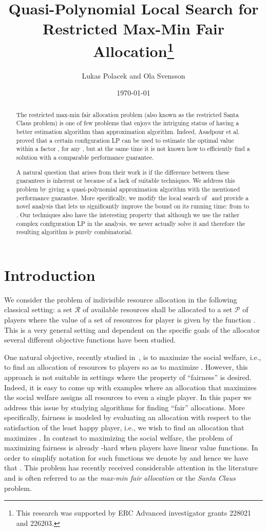 \documentclass{llncs}
\title{Quasi-Polynomial Local Search for Restricted Max-Min Fair Allocation\thanks{This research was supported by ERC Advanced investigator grants 228021 and 226203.}}
\author{Lukas Polacek\inst{1} and Ola Svensson\inst{2}}
\institute{KTH Royal Institute of Technology, Sweden
  \email{polacek@csc.kth.se}
  \and EPFL, Switzerland
  \email{ola.svensson@epfl.ch}
}
\date{\today}
\newcommand{\res}{\ensuremath{\mathcal{R}}\xspace}
\newcommand{\players}{\ensuremath{\mathcal{P}}\xspace}
\begin{document}
\maketitle

\begin{abstract}
The restricted max-min fair allocation problem (also known as the
restricted Santa Claus problem) is one of few problems that enjoys the
intriguing status of having a better estimation algorithm than
approximation algorithm. Indeed, Asadpour et al.~\cite{AFS08} proved
that a certain configuration LP can be used to estimate the optimal
value within a factor , for any , but at
the same time it is not known how to efficiently find a solution with
a comparable performance guarantee.

A natural question that arises from their work is if the difference
between these guarantees is inherent or because of a lack of suitable
techniques. We address this problem by giving a quasi-polynomial
approximation algorithm with the mentioned performance guarantee. More
specifically, we modify the local search of~\cite{AFS08} and provide a
novel analysis that lets us significantly improve the bound on its
running time: from  to . Our techniques also
have the interesting property that although we use the rather complex
configuration LP in the analysis, we never actually solve it and
therefore the resulting algorithm is purely combinatorial.
\end{abstract}

\section{Introduction}


We consider the problem of indivisible resource allocation in the
following classical setting: a set \res of available resources shall
be allocated to a set \players of players where the value of a set of
resources for player  is given by the function .
This is a very general setting and dependent on the specific goals of
the allocator several different objective functions have been studied.

One natural objective, recently studied
in~\cite{DS06,Feige06,FV06,Vondrak08}, is to maximize the social
welfare, i.e., to find an allocation  of
resources to players so as to maximize .  However, this approach is not suitable in settings
where the property of ``fairness'' is desired.  Indeed, it is easy to
come up with examples where an allocation that maximizes the social
welfare assigns all resources to even a single player. In this
paper we address this issue by studying algorithms for finding
``fair'' allocations. More specifically, fairness is modeled by
evaluating an allocation with respect to the satisfaction of the least
happy player, i.e., we wish to find an allocation  that maximizes
. In contrast to maximizing the
social welfare, the problem of maximizing fairness is already
-hard when players have linear value functions. In order
to simplify notation for such functions we denote  by
 and hence we have that . This problem has recently received
considerable attention in the literature and is often referred to as
the \emph{max-min fair allocation} or the \emph{Santa Claus} problem.
\end{document}

